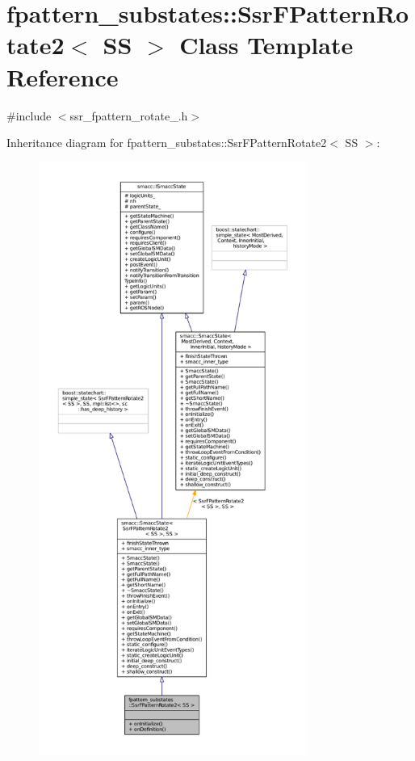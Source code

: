 \hypertarget{structfpattern__substates_1_1SsrFPatternRotate2}{}\section{fpattern\+\_\+substates\+:\+:Ssr\+F\+Pattern\+Rotate2$<$ SS $>$ Class Template Reference}
\label{structfpattern__substates_1_1SsrFPatternRotate2}


{\ttfamily \#include $<$ssr\+\_\+fpattern\+\_\+rotate\+\_.\+h$>$}



Inheritance diagram for fpattern\+\_\+substates\+:\+:Ssr\+F\+Pattern\+Rotate2$<$ SS $>$\+:
\nopagebreak
\begin{figure}[H]
\begin{center}
\leavevmode
\includegraphics[height=550pt]{structfpattern__substates_1_1SsrFPatternRotate2__inherit__graph}
\end{center}
\end{figure}


